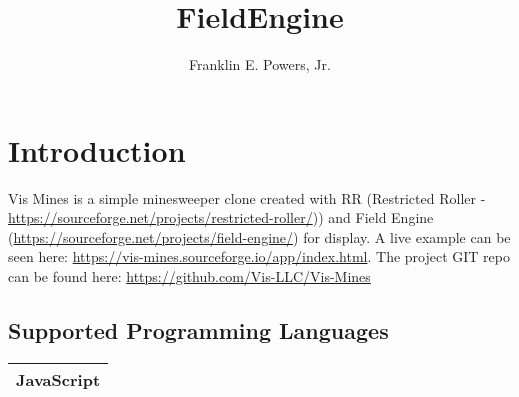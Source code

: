 \documentclass[11pt]{article}
\title{FieldEngine}
\author{Franklin E. Powers, Jr.}
\begin{document}
\maketitle

\section{Introduction}
Vis Mines is a simple minesweeper clone created with RR (Restricted Roller - \href{https://sourceforge.net/projects/restricted-roller/}{https://sourceforge.net/projects/restricted-roller/})) and Field Engine (\href{https://sourceforge.net/projects/field-engine/}{https://sourceforge.net/projects/field-engine/}) for display.  A live example can be seen here: \href{https://vis-mines.sourceforge.io/app/index.html}{https://vis-mines.sourceforge.io/app/index.html}.  The project GIT repo can be found here: \href{https://github.com/Vis-LLC/Vis-Mines}{https://github.com/Vis-LLC/Vis-Mines}

\subsection{Supported Programming Languages}
\begin{center}
\begin{tabular}{ | c | }
\hline
JavaScript \\
\hline
\end{tabular}
\end{center}
\end{document}
